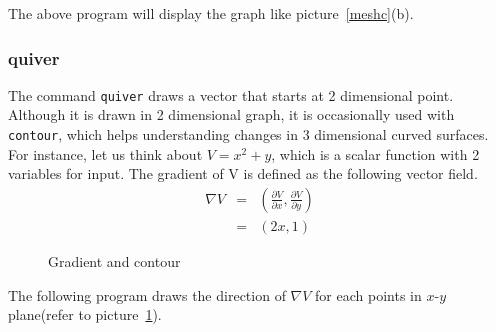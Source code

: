\begin{center}
\end{center}
\vn The above program will display the graph like picture~\ref{meshc}(b).

\subsubsection{quiver}
The command {\tt quiver} draws a vector that starts at 2 dimensional point. Although it is drawn in 2 dimensional graph, it is occasionally used with {\tt contour}, which helps understanding changes in 3 dimensional curved surfaces. For instance, let us think about $V = x^{2} + y$, which is a scalar function with 2 variables for input. The gradient of V is defined as the following vector field.
\begin{eqnarray*}
\nabla V & = & \left(\frac{\partial V}{\partial x}, \frac{\partial
V}{\partial y}\right) \\
         & = & (2x, 1)
\end{eqnarray*}

\begin{figure}[]
\center {} \caption{Gradient and contour} \label{grad}
\end{figure}

\noindent The following program draws the direction of $\nabla V$ for each points in $x$-$y$ plane(refer to picture~\ref{grad}).

\begin{center}
\end{center}

